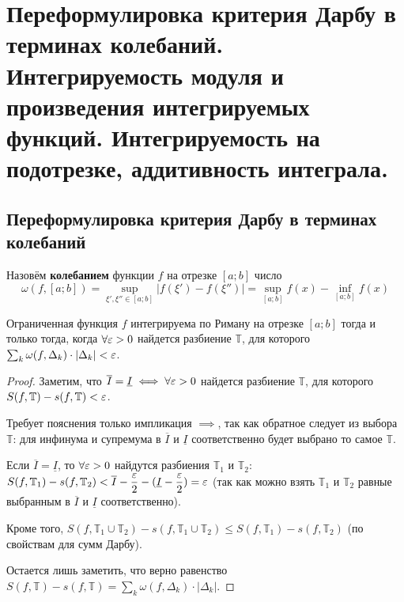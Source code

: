 \documentclass[a4paper]{article}
\theoremstyle{named}
\newcommand{\T}{\mathbb{T}}
\begin{document}
    \section{Переформулировка критерия Дарбу в терминах колебаний. Интегрируемость модуля и произведения интегрируемых функций. Интегрируемость на подотрезке, аддитивность интеграла.}

        \subsection{Переформулировка критерия Дарбу в терминах колебаний}

        \begin{definition*}
            Назовём \textbf{колебанием} функции $f$ на отрезке $[a; b]$ число
            \begin{equation*}
                \omega(f, [a; b]) = \sup\limits_{\xi', \xi'' \in [a; b]} |f(\xi') - f(\xi'')| = \sup\limits_{[a; b]} f(x) - \inf\limits_{[a; b]} f(x)
            \end{equation*}
        \end{definition*}

        \begin{consequence*}
            Ограниченная функция $f$ интегрируема по Риману на отрезке $[a; b]$ тогда и только тогда, когда $\forall \varepsilon > 0$ найдется разбиение $\T$, для которого $\sum_k \omega(f, \Delta_k) \cdot |\Delta_k| < \varepsilon$.
        \end{consequence*}

        \begin{proof}
            Заметим, что $\overline{I} = \underline{I} \iff \forall \varepsilon > 0$ найдется разбиение $\T$, для которого $S(f, \T) - s(f, \T) < \eps$.

            Требует пояснения только импликация $\implies$, так как обратное следует из выбора $\T$: для инфинума и супремума в $\overline{I}$ и $\underline{I}$ соответственно будет выбрано то самое $\T$.

            Если $\overline{I} = \underline{I}$, то $\forall \varepsilon > 0$ найдутся разбиения $\T_1$ и $\T_2$: $S(f, \T_1) - s(f, \T_2) < \overline{I} - \dfrac{\eps}{2} - (\underline{I} - \dfrac{\eps}{2}) = \eps$ (так как можно взять $\T_1$ и $\T_2$ равные выбранным в $\overline{I}$ и $\underline{I}$ соответственно).

            Кроме того, $S(f, \T_1 \cup \T_2) - s(f, \T_1 \cup \T_2) \leq S(f, \T_1) - s(f, \T_2)$ (по свойствам для сумм Дарбу). 

            Остается лишь заметить, что верно равенство $S(f, \T) - s(f, \T) = \sum_k \omega(f, \Delta_k) \cdot |\Delta_k|$.
        \end{proof}
\end{document}
